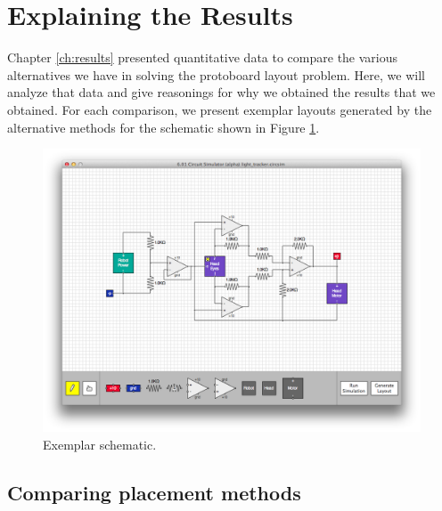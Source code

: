 \section{Explaining the Results}

Chapter \ref{ch:results} presented quantitative data to compare the various
alternatives we have in solving the protoboard layout problem. Here, we will
analyze that data and give reasonings for why we obtained the results
that we obtained. For each comparison, we present exemplar layouts generated
by the alternative methods for the schematic shown in Figure
\ref{fig:exemplar_schematic}.

\begin{figure}
\begin{center}
\includegraphics[width=\textwidth]{Images/exemplar_schematic.png}
\caption{Exemplar schematic.}
\label{fig:exemplar_schematic}
\end{center}
\end{figure}

\subsection{Comparing placement methods}


